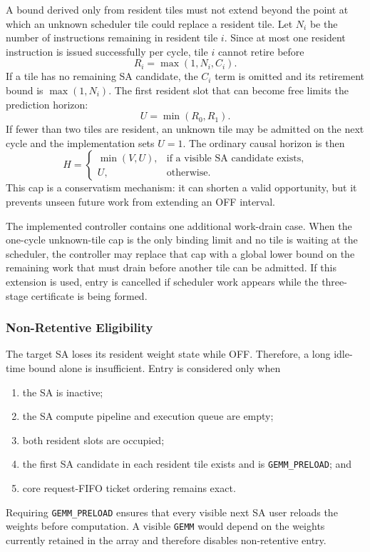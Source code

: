 A bound derived only from resident tiles must not extend beyond the point at
which an unknown scheduler tile could replace a resident tile. Let $N_i$ be
the number of instructions remaining in resident tile $i$. Since at most one
resident instruction is issued successfully per cycle, tile $i$ cannot retire
before
\begin{equation}
  R_i=\max(1,N_i,C_i).
  \label{eq:retirement-bound}
\end{equation}
If a tile has no remaining SA candidate, the $C_i$ term is omitted and its
retirement bound is $\max(1,N_i)$.
The first resident slot that can become free limits the prediction horizon:
\begin{equation}
  U=\min(R_0,R_1).
  \label{eq:future-tile-cap}
\end{equation}
If fewer than two tiles are resident, an unknown tile may be admitted on the
next cycle and the implementation sets $U=1$. The ordinary causal horizon is
then
\begin{equation}
  H=\begin{cases}
      \min(V,U), & \text{if a visible SA candidate exists},\\
      U,         & \text{otherwise}.
    \end{cases}
  \label{eq:safe-horizon}
\end{equation}
This cap is a conservatism mechanism: it can shorten a valid opportunity, but
it prevents unseen future work from extending an OFF interval.

The implemented controller contains one additional work-drain case. When the
one-cycle unknown-tile cap is the only binding limit and no tile is waiting at
the scheduler, the controller may replace that cap with a global lower bound
on the remaining work that must drain before another tile can be admitted.
If this extension is used, entry is cancelled if scheduler work appears while
the three-stage certificate is being formed.

\subsubsection{Non-Retentive Eligibility}

The target SA loses its resident weight state while OFF. Therefore, a long
idle-time bound alone is insufficient. Entry is considered only when
\begin{enumerate}
  \item the SA is inactive;
  \item the SA compute pipeline and execution queue are empty;
  \item both resident slots are occupied;
  \item the first SA candidate in each resident tile exists and is
        \texttt{GEMM\_PRELOAD}; and
  \item core request-FIFO ticket ordering remains exact.
\end{enumerate}
Requiring \texttt{GEMM\_PRELOAD} ensures that every visible next SA user
reloads the weights before computation. A visible \texttt{GEMM} would depend
on the weights currently retained in the array and therefore disables
non-retentive entry.

